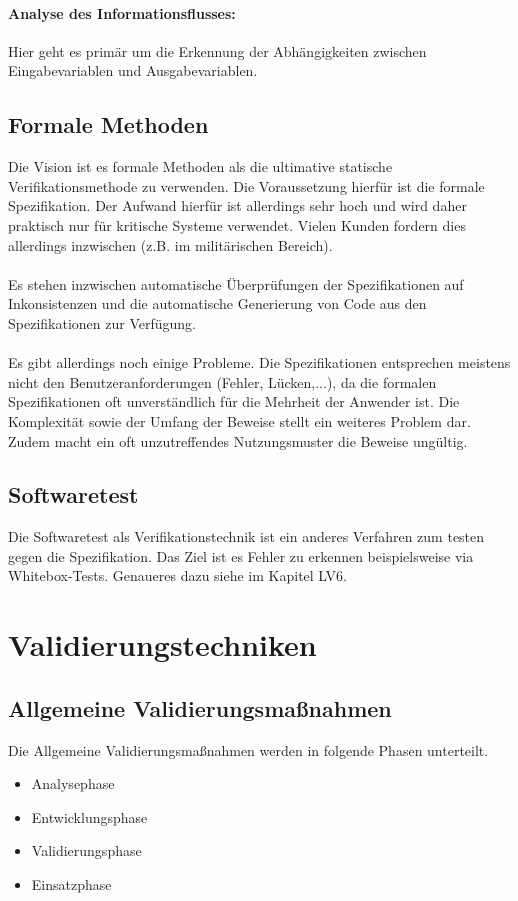 \paragraph{Analyse des Informationsflusses:} Hier geht es primär um die Erkennung der Abhängigkeiten zwischen Eingabevariablen und Ausgabevariablen.

\subsection{Formale Methoden}
Die Vision ist es formale Methoden als die ultimative statische Verifikationsmethode zu verwenden.
Die Voraussetzung hierfür ist die formale Spezifikation. Der Aufwand hierfür ist allerdings sehr hoch und wird daher praktisch nur für kritische Systeme verwendet. Vielen Kunden fordern dies allerdings inzwischen (z.B. im militärischen Bereich). 
\\\\
Es stehen inzwischen automatische Überprüfungen der Spezifikationen auf Inkonsistenzen und die automatische Generierung von Code aus den Spezifikationen zur Verfügung. 
\\\\
Es gibt allerdings noch einige Probleme. Die Spezifikationen entsprechen meistens nicht den Benutzeranforderungen (Fehler, Lücken,...), da die formalen Spezifikationen oft unverständlich für die Mehrheit der Anwender ist. Die Komplexität sowie der Umfang der Beweise stellt ein weiteres Problem dar. Zudem macht ein oft unzutreffendes Nutzungsmuster die Beweise ungültig.

\subsection{Softwaretest}
Die Softwaretest als Verifikationstechnik ist ein anderes Verfahren zum testen gegen die Spezifikation. Das Ziel ist es Fehler zu erkennen beispielsweise via Whitebox-Tests. Genaueres dazu siehe im Kapitel LV6.

\section{Validierungstechniken}
\subsection{Allgemeine Validierungsmaßnahmen}
Die Allgemeine Validierungsmaßnahmen werden in folgende Phasen unterteilt.
\begin{itemize}
\item Analysephase
\item Entwicklungsphase
\item Validierungsphase
\item Einsatzphase
\end{itemize}


